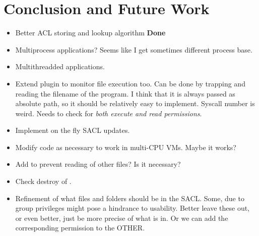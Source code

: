 
\chapter{Conclusion and Future Work}\label{ch:chapter5}

\begin{itemize}
	\item Better \ac{ACL} storing and lookup algorithm \textbf{Done}
	\item Multiprocess applications? Seems like I get sometimes different process base.
	\item Multithreadded applications. 
	\item Extend plugin to monitor file execution too. Can be done by trapping  and reading the filename of the program. I think that it is always passed as absolute path, so it should be relatively easy to implement. Syscall number is weird. Needs to check for \emph{both execute and read permissions}.
	\item Implement on the fly \ac{SACL} updates. 
	\item Modify code as necessary to work in multi-CPU \acp{VM}. Maybe it works?
	\item Add  to prevent reading of other files? Is it necessary?
	\item Check destroy of .
	\item Refinement of what files and folders should be in the \ac{SACL}. Some, due to group privileges might pose a hindrance to usability. Better leave these out, or even better, just be more precise of what is in. Or we can add the corresponding permission to the OTHER.
\end{itemize}

